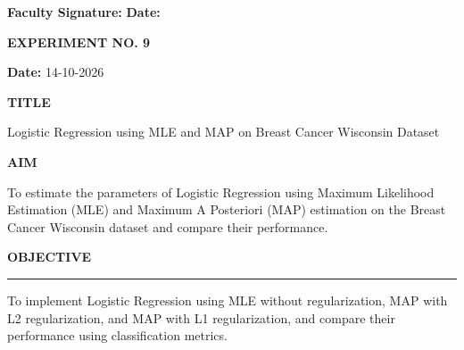 \documentclass[11pt,twoside]{article}
\newcommand{\expheading}[1]{{\fontsize{14}{17}\selectfont\textbf{#1}\par}}
\newcommand{\fullrule}{\noindent\rule{\textwidth}{0.6pt}\par}
\newcommand{\tooddpage}{\clearpage\ifodd\value{page}\else\null\thispagestyle{empty}\newpage\fi}
\begin{document}
\vspace{12pt}

\noindent\textbf{Faculty Signature:} \underline{\hspace{3.6cm}} \hfill \textbf{Date:} \underline{\hspace{2.8cm}}\par

\tooddpage

{\makeatletter\let\vspace\@gobble\makeatother\setlength{\parskip}{0pt}\setlength{\abovedisplayskip}{0pt}\setlength{\belowdisplayskip}{0pt}
\begin{center}
\expheading{EXPERIMENT NO. 9}
\end{center}
\vspace{2pt}

\noindent\textbf{Date:} 14-10-2026\par
\vspace{6pt}

\expheading{TITLE}
\vspace{4pt}
\noindent Logistic Regression using MLE and MAP on Breast Cancer Wisconsin Dataset\par
\vspace{4pt}

\expheading{AIM}
\vspace{4pt}
\noindent To estimate the parameters of Logistic Regression using Maximum Likelihood Estimation (MLE) and Maximum A Posteriori (MAP) estimation on the Breast Cancer Wisconsin dataset and compare their performance. \par
\vspace{4pt}

\expheading{OBJECTIVE}
\vspace{2pt}
\fullrule
\vspace{4pt}
\noindent To implement Logistic Regression using MLE without regularization, MAP with L2 regularization, and MAP with L1 regularization, and compare their performance using classification metrics. \par
\vspace{4pt}

}
\end{document}
